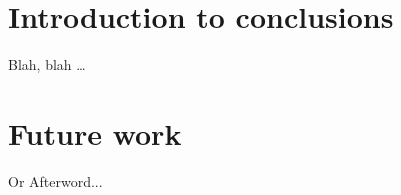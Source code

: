 \chapter{Introduction to conclusions}\label{sec:something}

Blah, blah \dots

 \cleardoublepage


\chapter{Future work}\label{sec:again_something}

Or Afterword...

 \cleardoublepage
